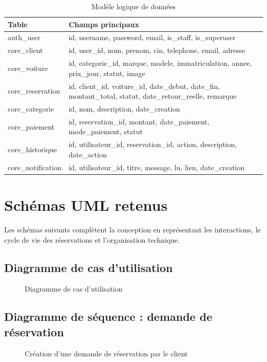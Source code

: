 \begin{table}[H]
\centering
\caption{Modèle logique de données}
\begin{tabularx}{\textwidth}{|l|X|}
\hline
\textbf{Table} & \textbf{Champs principaux} \\
\hline
auth\_user & id, username, password, email, is\_staff, is\_superuser \\
\hline
core\_client & id, user\_id, nom, prenom, cin, telephone, email, adresse \\
\hline
core\_voiture & id, categorie\_id, marque, modele, immatriculation, annee, prix\_jour, statut, image \\
\hline
core\_reservation & id, client\_id, voiture\_id, date\_debut, date\_fin, montant\_total, statut, date\_retour\_reelle, remarque \\
\hline
core\_categorie & id, nom, description, date\_creation \\
\hline
core\_paiement & id, reservation\_id, montant, date\_paiement, mode\_paiement, statut \\
\hline
core\_historique & id, utilisateur\_id, reservation\_id, action, description, date\_action \\
\hline
core\_notification & id, utilisateur\_id, titre, message, lu, lien, date\_creation \\
\hline
\end{tabularx}
\end{table}

\section{Schémas UML retenus}

Les schémas suivants complètent la conception en représentant les interactions, le cycle de vie des réservations et l'organisation technique.

\subsection{Diagramme de cas d'utilisation}
\begin{figure}[H]
\centering
{}
\caption{Diagramme de cas d'utilisation}
\end{figure}

\subsection{Diagramme de séquence : demande de réservation}
\begin{figure}[H]
\centering
{}
\caption{Création d'une demande de réservation par le client}
\end{figure}

